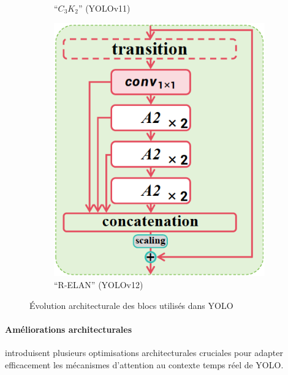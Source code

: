 \begin{figure}[H]
\begin{subfigure}[b]{0.45\textwidth}
        \caption{``$C_3K_2$'' (YOLOv11)}
        \label{fig:ch2_yolo_08_architecture_c3k2}
    \end{subfigure}
    \hfill
    \begin{subfigure}[b]{0.33\textwidth}
        \centering
        \includegraphics[width=\textwidth]{02-main/figures/ch2/ch2_yolo_09_architecture_relan.png}
        \caption{``R-ELAN'' (YOLOv12)}
        \label{fig:ch2_yolo_09_architecture_relan}
    \end{subfigure}
    \caption{Évolution architecturale des blocs utilisés dans YOLO \cite{tian_yolov12_2025}}
    \label{fig:ch2_yolo_architecture_simplifiee}
\end{figure}

\paragraph{Améliorations architecturales}
\citeauthor{tian_yolov12_2025} introduisent plusieurs optimisations architecturales cruciales pour adapter efficacement les mécanismes d'attention au contexte temps réel de YOLO.

